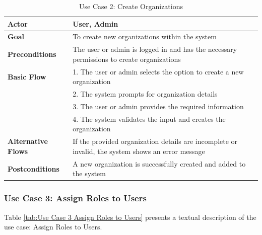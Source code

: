 \begin{table}[ht]
	\centering
	\begin{tabularx}{\textwidth}{|l|X|}
		\hline
		\textbf{Actor}             & User, Admin                                                                                       \\
		\hline
		\textbf{Goal}              & To create new organizations within the system                                                     \\
		\hline
		\textbf{Preconditions}     & The user or admin is logged in and has the necessary permissions to create organizations          \\
		\hline
		\textbf{Basic Flow}        & 1. The user or admin selects the option to create a new organization                              \\
		                           & 2. The system prompts for organization details                                                    \\
		                           & 3. The user or admin provides the required information                                            \\
		                           & 4. The system validates the input and creates the organization                                    \\
		\hline
		\textbf{Alternative Flows} & If the provided organization details are incomplete or invalid, the system shows an error message \\
		\hline
		\textbf{Postconditions}    & A new organization is successfully created and added to the system                                \\
		\hline
	\end{tabularx}
	\caption{Use Case 2: Create Organizations}
	\label{tab:Use Case 2 Create Organizations}
\end{table}

\subsubsection{Use Case 3: Assign Roles to Users}

Table \ref{tab:Use Case 3 Assign Roles to Users} presents a textual description of the use case: Assign Roles to Users.

